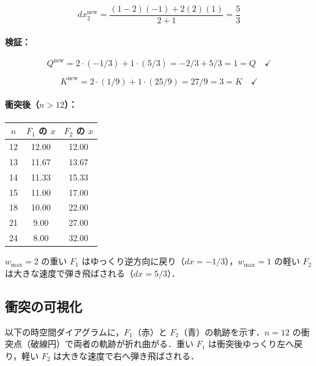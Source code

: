 \documentclass[12pt,a4paper]{ltjsarticle}
\begin{document}
\begin{equation}
dx_2^{\text{new}} = \frac{(1-2)(-1) + 2(2)(1)}{2+1} = \frac{5}{3}
\end{equation}

\paragraph{検証：}

\begin{equation}
Q^{\text{new}} = 2 \cdot (-1/3) + 1 \cdot (5/3) = -2/3 + 5/3 = 1 = Q \quad \checkmark
\end{equation}

\begin{equation}
K^{\text{new}} = 2 \cdot (1/9) + 1 \cdot (25/9) = 27/9 = 3 = K \quad \checkmark
\end{equation}

\paragraph{衝突後（$n > 12$）：}

\begin{table}[h]
\centering
\begin{tabular}{ccc}
\toprule
$n$ & $F_1$ の $x$ & $F_2$ の $x$ \\
\midrule
12 & 12.00 & 12.00 \\
13 & 11.67 & 13.67 \\
14 & 11.33 & 15.33 \\
15 & 11.00 & 17.00 \\
18 & 10.00 & 22.00 \\
21 & 9.00  & 27.00 \\
24 & 8.00  & 32.00 \\
\bottomrule
\end{tabular}
\end{table}

$w_{\max} = 2$ の重い $F_1$ はゆっくり逆方向に戻り（$dx = -1/3$），$w_{\max} = 1$ の軽い $F_2$ は大きな速度で弾き飛ばされる（$dx = 5/3$）．

\subsection{衝突の可視化}

以下の時空間ダイアグラムに，$F_1$（赤）と $F_2$（青）の軌跡を示す．$n = 12$ の衝突点（破線円）で両者の軌跡が折れ曲がる．重い $F_1$ は衝突後ゆっくり左へ戻り，軽い $F_2$ は大きな速度で右へ弾き飛ばされる．
\end{document}
